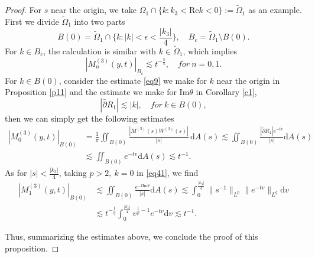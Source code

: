 \documentclass[11pt]{article}
\numberwithin{equation}{section}
\begin{document}
\begin{proof}
    For  $s$ near the origin, we take $\Omega_{1}\cap\{k:k_3<\mathrm{Re}k<0\}:=\widetilde\Omega_1$ as an example. First we divide $\widetilde\Omega_1$ into two parts
    \begin{equation*}
        B(0)=\widetilde\Omega_1\cap\{k:|k|<\epsilon<\frac{|k_3|}{4}\},\quad B_{c}=\widetilde\Omega_1\setminus B(0).
    \end{equation*}
For $k\in B_{c}$, the calculation is similar with $k\in\widetilde\Omega_1$, which implies
\begin{equation*}
    |M^{(3)}_n(y,t)|_{B_{c}}\lesssim t^{-\frac{3}{4}},\quad for\ n=0,1.
\end{equation*}
For $k\in B(0)$, consider the estimate \eqref{eq9} we make for $k$ near the origin in Proposition \ref{p11} and the estimate we make for $\mathrm{Im}\theta$ in Corollary \ref{c1},
\begin{equation*}
    |\bar{\partial}R_1|\lesssim |k|,\quad for \ k\in B(0) ,
\end{equation*}
then we can simply get the following estimates
\begin{align*}
     |M^{(3)}_0(y, t) |_{B(0)}&= \frac{1}{\pi} \iint_{B(0)} \frac{|M^{(3)}(s) W^{(3)}(s)|}{|s|} \, \mathrm{d}A(s)\lesssim \iint_{B(0)}\frac{|\bar{\partial}R_1|e^{-tv}}{|s|}\mathrm{d}A(s)\\
     &\lesssim \iint_{B(0)}e^{-tv}\mathrm{d}A(s)\lesssim t^{-1}.
\end{align*}
As for $|s|<\frac{|k_3|}{4}$, taking $p>2,\ k=0$ in \eqref{eq41}, we find
\begin{align*}
    |M^{(3)}_1(y, t) |_{B(0)}&\lesssim\iint_{B(0)}\frac{e^{-t\mathrm{Im}\theta}}{|s|}\mathrm{d}A(s) \lesssim
\int_0^{\frac{|k_3|}{4}}\| s^{-1}\|_{L^p}\| e^{-tv}\|_{L^q}\mathrm{d}v\\
&\lesssim t^{-\frac{1}{q}}\int_0^{\frac{|k_3|}{4}}v^{\frac{1}{p}-1}e^{-tv}\mathrm{d}v
\lesssim t^{-1}.
\end{align*}

Thus, summarizing the estimates above, we conclude the proof of this proposition.
\end{proof}
\end{document}
